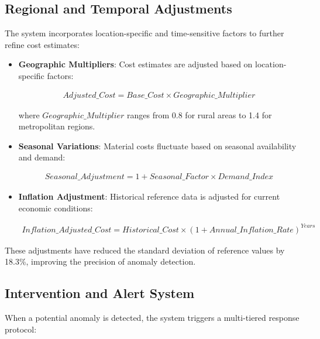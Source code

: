 \documentclass[12pt,a4paper]{report}
\begin{document}
\subsection{Regional and Temporal Adjustments}
\indent \indent The system incorporates location-specific and time-sensitive factors to further refine cost estimates:

\begin{itemize}
    \item \textbf{Geographic Multipliers}: Cost estimates are adjusted based on location-specific factors:
    
    \begin{align}
        Adjusted\_Cost = Base\_Cost \times Geographic\_Multiplier
    \end{align}
    
    where $Geographic\_Multiplier$ ranges from 0.8 for rural areas to 1.4 for metropolitan regions.
    
    \item \textbf{Seasonal Variations}: Material costs fluctuate based on seasonal availability and demand:
    
    \begin{align}
        Seasonal\_Adjustment = 1 + Seasonal\_Factor \times Demand\_Index
    \end{align}
    
    \item \textbf{Inflation Adjustment}: Historical reference data is adjusted for current economic conditions:
    
    \begin{align}
        Inflation\_Adjusted\_Cost = Historical\_Cost \times (1 + Annual\_Inflation\_Rate)^{Years}
    \end{align}
\end{itemize}

\noindent These adjustments have reduced the standard deviation of reference values by 18.3\%, improving the precision of anomaly detection.

\subsection{Intervention and Alert System}
\indent \indent When a potential anomaly is detected, the system triggers a multi-tiered response protocol:
\end{document}
